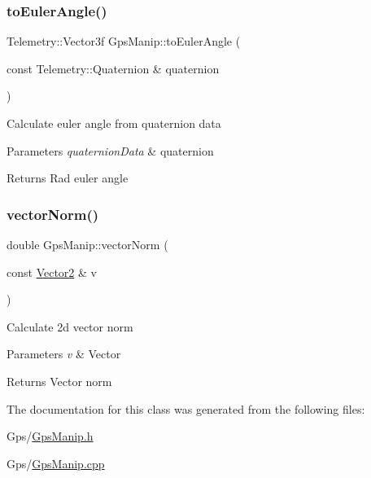 \subsubsection{\texorpdfstring{to\+Euler\+Angle()}{toEulerAngle()}}
{\footnotesize\ttfamily Telemetry\+::\+Vector3f Gps\+Manip\+::to\+Euler\+Angle (\begin{DoxyParamCaption}\item[{const Telemetry\+::\+Quaternion \&}]{quaternion }\end{DoxyParamCaption})\hspace{0.3cm}{\ttfamily [static]}}

Calculate euler angle from quaternion data 
\begin{DoxyParams}{Parameters}
{\em quaternion\+Data} & quaternion \\
\hline
\end{DoxyParams}
\begin{DoxyReturn}{Returns}
Rad euler angle 
\end{DoxyReturn}
\mbox{\label{class_m210_1_1_gps_manip_a8703f003ce3fde60baf51473dd3ec6b7}} 
\subsubsection{\texorpdfstring{vector\+Norm()}{vectorNorm()}}
{\footnotesize\ttfamily double Gps\+Manip\+::vector\+Norm (\begin{DoxyParamCaption}\item[{const \mbox{\hyperlink{struct_vector2}{Vector2}} \&}]{v }\end{DoxyParamCaption})\hspace{0.3cm}{\ttfamily [static]}}

Calculate 2d vector norm 
\begin{DoxyParams}{Parameters}
{\em v} & Vector \\
\hline
\end{DoxyParams}
\begin{DoxyReturn}{Returns}
Vector norm 
\end{DoxyReturn}


The documentation for this class was generated from the following files\+:\begin{DoxyCompactItemize}
\item 
Gps/\mbox{\hyperlink{_gps_manip_8h}{Gps\+Manip.\+h}}\item 
Gps/\mbox{\hyperlink{_gps_manip_8cpp}{Gps\+Manip.\+cpp}}\end{DoxyCompactItemize}
